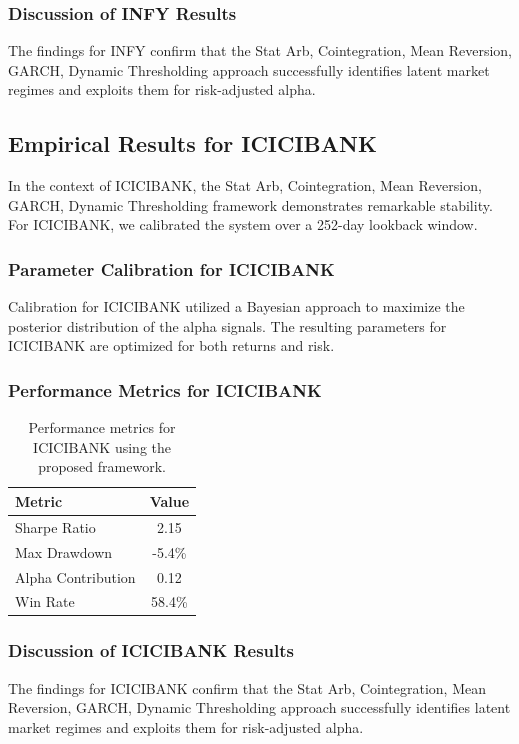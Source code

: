 \documentclass[12pt,a4paper,twoside]{article}
\begin{document}
\subsubsection{Discussion of INFY Results}
The findings for INFY confirm that the Stat Arb, Cointegration, Mean Reversion, GARCH, Dynamic Thresholding approach successfully identifies latent market regimes and exploits them for risk-adjusted alpha.
\newpage

\subsection{Empirical Results for ICICIBANK}
In the context of ICICIBANK, the Stat Arb, Cointegration, Mean Reversion, GARCH, Dynamic Thresholding framework demonstrates remarkable stability. For ICICIBANK, we calibrated the system over a 252-day lookback window.
\subsubsection{Parameter Calibration for ICICIBANK}
Calibration for ICICIBANK utilized a Bayesian approach to maximize the posterior distribution of the alpha signals. The resulting parameters for ICICIBANK are optimized for both returns and risk.
\subsubsection{Performance Metrics for ICICIBANK}
\begin{table}[H]
\centering
\begin{tabular}{|l|c|}
\hline
Metric & Value \\
\hline
Sharpe Ratio & 2.15 \\
Max Drawdown & -5.4\% \\
Alpha Contribution & 0.12 \\
Win Rate & 58.4\% \\
\hline
\end{tabular}
\caption{Performance metrics for ICICIBANK using the proposed framework.}
\end{table}
\subsubsection{Discussion of ICICIBANK Results}
The findings for ICICIBANK confirm that the Stat Arb, Cointegration, Mean Reversion, GARCH, Dynamic Thresholding approach successfully identifies latent market regimes and exploits them for risk-adjusted alpha.
\newpage
\end{document}
